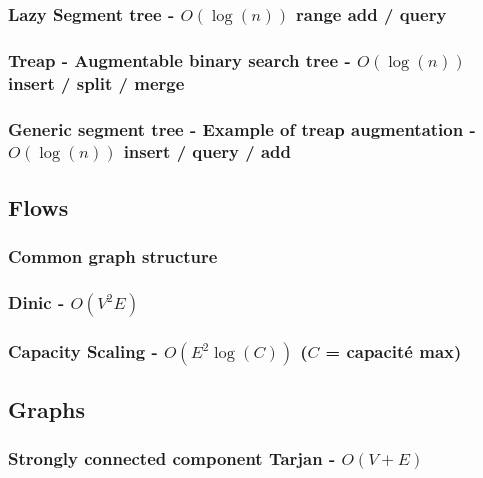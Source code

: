 \documentclass[landscape,a4paper,twocolumn,10pt]{report}
\begin{document}
\subsubsection{Lazy Segment tree - $O(\log(n))$ range add / query}


\subsubsection{Treap - Augmentable binary search tree - $O(\log(n))$ insert / split / merge}


\subsubsection{Generic segment tree - Example of treap augmentation - $O(\log(n))$ insert / query / add}



\subsection*{Flows}
\label{flows}

\subsubsection{Common graph structure}


\subsubsection{Dinic - $O(V^2 E)$}


\subsubsection{Capacity Scaling - $O(E^2 \log(C))$ ($C$ = capacité max)}




\subsection*{Graphs}
\label{graphs}

\subsubsection{Strongly connected component Tarjan - $O(V + E)$}

\end{document}
